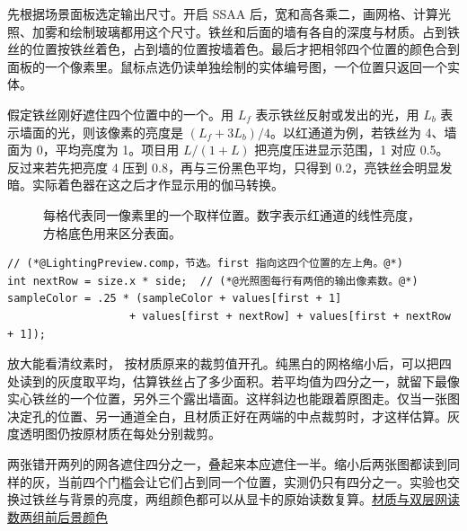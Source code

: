  先根据场景面板选定输出尺寸。开启 SSAA 后，宽和高各乘二，画网格、计算光照、加雾和绘制玻璃都用这个尺寸。铁丝和后面的墙有各自的深度与材质。占到铁丝的位置按铁丝着色，占到墙的位置按墙着色。最后才把相邻四个位置的颜色合到面板的一个像素里。鼠标点选仍读单独绘制的实体编号图，一个位置只返回一个实体。

假定铁丝刚好遮住四个位置中的一个。用 $L_f$ 表示铁丝反射或发出的光，用 $L_b$ 表示墙面的光，则该像素的亮度是 $(L_f+3L_b)/4$。以红通道为例，若铁丝为 4、墙面为 0，平均亮度为 1。项目用 $L/(1+L)$ 把亮度压进显示范围，1 对应 0.5。反过来若先把亮度 4 压到 0.8，再与三份黑色平均，只得到 0.2，亮铁丝会明显发暗。实际着色器在这之后才作显示用的伽马转换。

\begin{figure}[H]\centering
{}
\caption{每格代表同一像素里的一个取样位置。数字表示红通道的线性亮度，方格底色用来区分表面。}
\end{figure}

\begin{lstlisting}
// (*@LightingPreview.comp，节选。first 指向这四个位置的左上角。@*)
int nextRow = size.x * side;  // (*@光照图每行有两倍的输出像素数。@*)
sampleColor = .25 * (sampleColor + values[first + 1]
                   + values[first + nextRow] + values[first + nextRow + 1]);
\end{lstlisting}

放大能看清纹素时， 按材质原来的裁剪值开孔。纯黑白的网格缩小后，可以把四处读到的灰度取平均，估算铁丝占了多少面积。若平均值为四分之一，就留下最像实心铁丝的一个位置，另外三个露出墙面。这样斜边也能跟着原图走。仅当一张图决定孔的位置、另一通道全白，且材质正好在两端的中点裁剪时，才这样估算。灰度透明图仍按原材质在每处分别裁剪。

两张错开两列的网各遮住四分之一，叠起来本应遮住一半。缩小后两张图都读到同样的灰，当前四个门槛会让它们占到同一个位置，实测仍只有四分之一。实验也交换过铁丝与背景的亮度，两组颜色都可以从显卡的原始读数复算。\href{run:../validation/mask-supersampling/subpixel-materials.csv}{材质与双层网读数}\quad\href{run:../validation/mask-supersampling/two-colors.png}{两组前后景颜色}\quad{}
